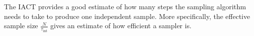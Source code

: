 The IACT provides a good estimate of how many steps the sampling algorithm needs to take to produce one independent sample.
More specifically, the effective sample size $\frac{N}{ \tau_{\text{int}} }$ gives an estimate of how efficient a sampler is.
\clearpage
%
%
%
